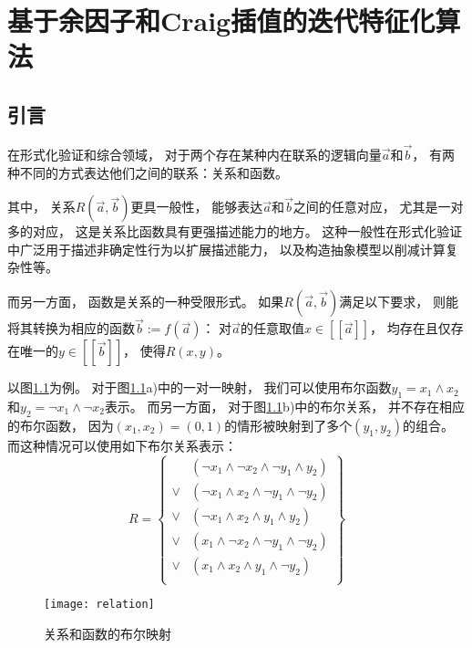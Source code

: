 \chapter{基于余因子和Craig插值的迭代特征化算法}
\label{chap:interative_craig}



\section{引言}

在形式化验证和综合领域，
对于两个存在某种内在联系的逻辑向量$\vec{a}$和$\vec{b}$，
有两种不同的方式表达他们之间的联系：关系和函数。

其中，
关系$R(\vec{a},\vec{b})$更具一般性，
能够表达$\vec{a}$和$\vec{b}$之间的任意对应，
尤其是一对多的对应，
这是关系比函数具有更强描述能力的地方。
这种一般性在形式化验证中广泛用于描述非确定性行为以扩展描述能力，
以及构造抽象模型以削减计算复杂性等。

而另一方面，
函数是关系的一种受限形式。
如果$R(\vec{a},\vec{b})$满足以下要求，
则能将其转换为相应的函数$\vec{b}:=f(\vec{a})$：
对$\vec{a}$的任意取值$x\in[\![\vec{a}]\!]$，
均存在且仅存在唯一的$y\in[\![\vec{b}]\!]$，
使得$R(x,y)$。

以图\ref{fig_relation}为例。
对于图\ref{fig_relation}a)中的一对一映射，
我们可以使用布尔函数$y_1=x_1\wedge x_2$和$y_2=\neg x_1\wedge \neg x_2$表示。
而另一方面，
对于图\ref{fig_relation}b)中的布尔关系，
并不存在相应的布尔函数，
因为$(x_1,x_2)=(0,1)$的情形被映射到了多个$(y_1,y_2)$的组合。
而这种情况可以使用如下布尔关系表示：
\begin{equation}
R=
\left\{
\begin{array}{cc}
     & (\neg x_1\wedge\neg x_2\wedge \neg y_1\wedge y_2)\\
\vee & (\neg x_1\wedge x_2\wedge \neg y_1\wedge \neg y_2)\\
\vee & (\neg x_1\wedge x_2\wedge y_1\wedge y_2)\\
\vee & (x_1\wedge \neg x_2\wedge \neg y_1 \wedge \neg y_2)\\
\vee & (x_1\wedge x_2\wedge y_1\wedge \neg y_2)\\
\end{array}
\right\}
\end{equation}

\begin{figure}[b]
\begin{center}
\texttt{[image: relation]}
\end{center}
\caption{关系和函数的布尔映射}
  \label{fig_relation}
\end{figure}

